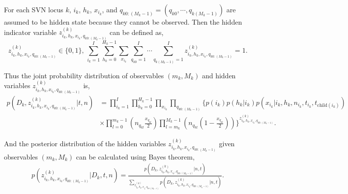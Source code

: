 \documentclass{article}
\begin{document}
For each SVN locus $k$, $i_k$, $h_k$, $x_{i_k}$, and $q_{k 0:(M_k - 1)} = ( q_{k 0}, \cdots, q_{k (M_k-1)} )$ are assumed to be hidden state because they cannot be observed.
Then the hidden indicator variable $z^{(k)}_{i_k, h_k, x_{i_k}, q_{k 0:(M_k - 1)}}$ can be defined as,
\begin{equation}
 z^{(k)}_{i_k, h_k, x_{i_k}, q_{k 0:(M_k - 1)}} \in \{0, 1\} \text{, } \sum_{i_k=1}^{I} \sum_{h_k=0}^{H_k - 1} \sum_{x_{i_k}} \sum_{q_{k0}=1}^{I} \cdots \sum_{q_{k (M_k - 1)}=1}^{I} z^{(k)}_{i_k, h_k, x_{i_k}, q_{k 0:(M_k - 1)}} = 1.
\end{equation}

Thus the joint probability distribution of observables $(m_k,M_k)$ and hidden variables $z^{(k)}_{i_k, h_k, x_{i_k}, q_{k 0:(M_k - 1)}}$ is,
\begin{align}
 p\left(D_k, z^{(k)}_{i_k, h_k, x_{i_k}, q_{k 0:(M_k - 1)}} \big| t, n\right) &= \prod_{i_k=1}^{I} \prod_{h_k=0}^{H_k - 1} \prod_{x_{i_k}} \prod_{q_{k 0:(M_k - 1)}} \Biggl\{p(i_k) p(h_k | i_k) p(x_{i_k} | i_k, h_k, n_{i_k}, t_{i_k}, t_{\mathrm{child}(i_k)})\nonumber\\
&\times \prod_{l=0}^{m_k - 1} \left( n_{q_{kl}} \frac{x_{q_{kl}}}{2} \right) \prod_{l=m_k}^{M_k - 1} \left( n_{q_{kl}} \left(1-\frac{x_{q_{kl}}}{2} \right) \right) \Biggr\}^{z^{(k)}_{i_k, h_k, x_{i_k}, q_{k 0:(M_k - 1)}}}.
\end{align}

And the posterior distribution of the hidden variables $z^{(k)}_{i_k, h_k, x_{i_k}, q_{k 0:(M_k - 1)}}$ given observables $(m_k,M_k)$ can be calculated using Bayes theorem,
\begin{align}
 p\left(z^{(k)}_{i_k, h_k, x_{i_k}, q_{k 0:(M_k - 1)}} \big| D_k, t, n\right) = \frac{p\left(D_k, z^{(k)}_{i_k, h_k, x_{i_k}, q_{k 0:(M_k - 1)}} \big| n, t\right)}{ \sum_{z^{(k)}_{i_k, h_k, x_{i_k}, q_{k 0:(M_k - 1)}}} p\left(D_k, z^{(k)}_{i_k, h_k, x_{i_k}, q_{k 0:(M_k - 1)}} \big| n, t\right) }.
\end{align}
\end{document}
